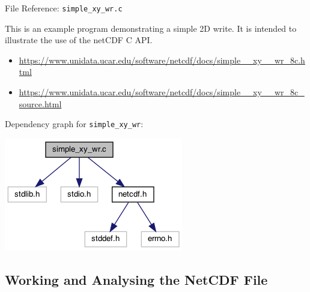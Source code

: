 \documentclass[compress,11pt,xcolor=svgnames,aspectratio=169]{beamer}
\begin{document}

\begin{frame}[fragile]{File Reference: \texttt{simple\_xy\_wr.c}}

This is an example program demonstrating a simple 2D write. It is intended to illustrate the use of the netCDF C API.\\[0.3cm]

\begin{itemize}
  \item {\tiny \url{https://www.unidata.ucar.edu/software/netcdf/docs/simple__xy__wr_8c.html}}
  \item {\tiny \url{https://www.unidata.ucar.edu/software/netcdf/docs/simple__xy__wr_8c_source.html}}
\end{itemize}

Dependency graph for \verb|simple_xy_wr|:

\begin{center}
\includegraphics[scale=0.5]{fig/simple__xy__wr_8c__incl}
\end{center}

\end{frame}

\subsection{Working and Analysing the NetCDF File}
\end{document}
